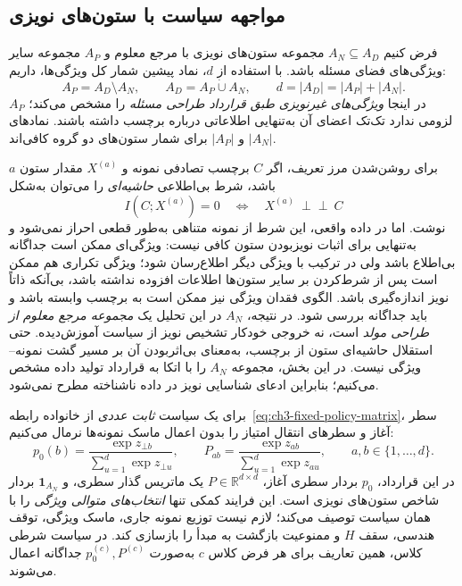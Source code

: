\subsection{مواجهه سیاست با ستون‌های نویزی}
\label{subsec:ch3-noise-selection}
فرض کنیم $A_N\subseteq A_D$ مجموعه
ستون‌های نویزی با مرجع معلوم
و $A_P$ مجموعه سایر ویژگی‌های
فضای مسئله باشد. با استفاده از
$d$، نماد پیشین شمار کل ویژگی‌ها،
داریم:
\begin{equation}\label{eq:ch3-noise-feature-sets}
\boxed{
A_P=A_D\setminus A_N,\qquad
A_D=A_P\mathbin{\dot\cup}A_N,\qquad
d=|A_D|=|A_P|+|A_N|.
}
\end{equation}
$A_P$ در اینجا \emph{ویژگی‌های غیرنویزی
طبق قرارداد طراحی مسئله} را مشخص می‌کند؛
لزومی ندارد تک‌تک اعضای آن به‌تنهایی
اطلاعاتی درباره برچسب داشته باشند.
نمادهای $|A_N|$ و $|A_P|$
برای شمار ستون‌های دو گروه کافی‌اند.

برای روشن‌شدن مرز تعریف، اگر $C$ برچسب تصادفی
نمونه و $X^{(a)}$ مقدار ستون $a$ باشد،
شرط بی‌اطلاعی \emph{حاشیه‌ای} را می‌توان به‌شکل
\begin{equation}\label{eq:ch3-noise-marginal-independence}
I(C;X^{(a)})=0
\quad\Longleftrightarrow\quad
X^{(a)}\ \perp\!\!\!\perp\ C
\end{equation}
نوشت. اما در داده واقعی، این شرط از نمونه
متناهی به‌طور قطعی احراز نمی‌شود و
به‌تنهایی برای اثبات نویزبودن ستون کافی نیست:
ویژگی‌ای ممکن است جداگانه بی‌اطلاع باشد ولی
در ترکیب با ویژگی دیگر اطلاع‌رسان شود؛
ویژگی تکراری هم ممکن است پس از شرط‌کردن بر سایر
ستون‌ها اطلاعات افزوده نداشته باشد، بی‌آنکه
ذاتاً نویز اندازه‌گیری باشد.
الگوی فقدان ویژگی نیز ممکن است به برچسب
وابسته باشد و باید جداگانه بررسی شود.
در نتیجه، $A_N$ در این تحلیل یک
\emph{مجموعه مرجع معلوم از طراحی مولد} است،
نه خروجی خودکار تشخیص نویز از سیاست آموزش‌دیده.
حتی استقلال حاشیه‌ای ستون از برچسب،
به‌معنای بی‌اثربودن آن بر مسیر گشت
نمونه--ویژگی نیست. در این بخش،
مجموعه $A_N$ را با اتکا به
قرارداد تولید داده مشخص می‌کنیم؛
بنابراین ادعای شناسایی نویز
در داده ناشناخته مطرح نمی‌شود.

برای یک سیاست \emph{ثابت عددی} از خانواده
رابطه~\eqref{eq:ch3-fixed-policy-matrix}،
سطر آغاز و سطرهای انتقال امتیاز را بدون اعمال
ماسک نمونه‌ها نرمال می‌کنیم:
\begin{equation}\label{eq:ch3-noise-policy-probabilities}
p_0(b)=\frac{\exp z_{\bot b}}{\sum_{u=1}^{d}\exp z_{\bot u}},
\qquad
P_{ab}=\frac{\exp z_{ab}}{\sum_{u=1}^{d}\exp z_{au}},
\qquad a,b\in\{1,\ldots,d\}.
\end{equation}
در این قرارداد، $p_0$ بردار سطری آغاز،
$P\in\mathbb R^{d\times d}$ یک ماتریس گذار سطری،
و $\mathbf 1_{A_N}$ بردار شاخص ستون‌های نویزی است.
این فرایند کمکی تنها \emph{انتخاب‌های متوالی ویژگی} را
با همان سیاست توصیف می‌کند؛ لازم نیست توزیع
نمونه جاری، ماسک ویژگی، توقف هندسی، سقف $H$ و
ممنوعیت بازگشت به مبدأ را بازسازی کند.
در سیاست شرطی کلاس، همین تعاریف برای هر فرض کلاس
$c$ به‌صورت $p_0^{(c)},P^{(c)}$ جداگانه اعمال می‌شوند.

